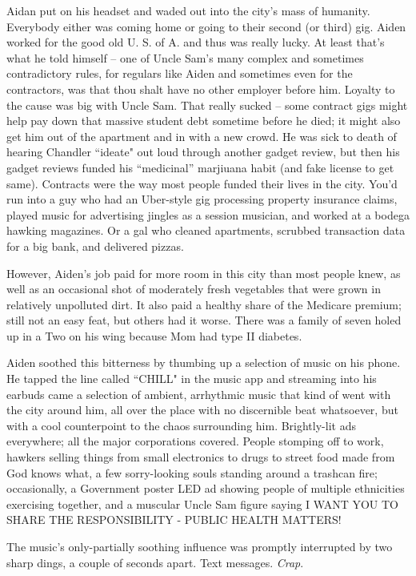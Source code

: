 \documentclass[11pt]{book}
\begin{document}
	Aidan put on his headset and waded out into the city's mass of humanity. Everybody either was coming home or going to their second (or third) gig. Aiden worked for the good old U. S. of A. and thus was really lucky. At least that's what he told himself -- one of Uncle Sam's many complex and sometimes contradictory rules, for regulars like Aiden and sometimes even for the contractors, was that thou shalt have no other employer before him. Loyalty to the cause was big with Uncle Sam. That really sucked -- some contract gigs might help pay down that massive student debt sometime before he died; it might also get him out of the apartment and in with a new crowd. He was sick to death of hearing Chandler ``ideate" out loud through another gadget review, but then his gadget reviews funded his ``medicinal'' marjiuana habit (and fake license to get same). Contracts were the way most people funded their lives in the city. You'd run into a guy who had an Uber-style gig processing property insurance claims, played music for advertising jingles as a session musician, and worked at a bodega hawking magazines. Or a gal who cleaned apartments, scrubbed transaction data for a big bank, and delivered pizzas.
	
	However, Aiden's job paid for more room in this city than most people knew, as well as an occasional shot of moderately fresh vegetables that were grown in relatively unpolluted dirt. It also paid a healthy share of the Medicare premium; still not an easy feat, but others had it worse. There was a family of seven holed up in a Two on his wing because Mom had type II diabetes.
	
	Aiden soothed this bitterness by thumbing up a selection of music on his phone. He tapped the line called ``CHILL" in the music app and streaming into his earbuds came a selection of ambient, arrhythmic music that kind of went with the city around him, all over the place with no discernible beat whatsoever, but with a cool counterpoint to the chaos surrounding him. Brightly-lit ads everywhere; all the major corporations covered. People stomping off to work, hawkers selling things from small electronics to drugs to street food made from God knows what, a few sorry-looking souls standing around a trashcan fire; occasionally, a Government poster LED ad showing people of multiple ethnicities exercising together, and a muscular Uncle Sam figure saying I WANT YOU TO SHARE THE RESPONSIBILITY - PUBLIC HEALTH MATTERS! 
	
	The music's only-partially soothing influence was promptly interrupted by two sharp dings, a couple of seconds apart. Text messages. \textit{Crap}.
	
\end{document}
